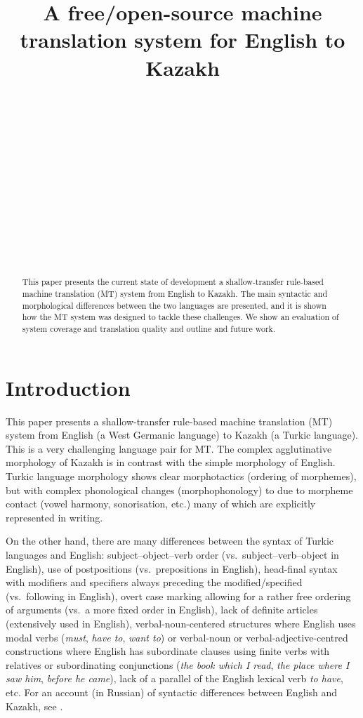 \documentclass[11pt]{article}
\title{A free/open-source machine translation system for English to Kazakh}
\author{\anonymize{Aida Sundetova}\\
  \anonymize{Kazakh National University, } \\
  \anonymize{050040 Almaty, Kazakhstan} \\
  \anonymize{{\tt sun27aida@gmail.com}}\\
  \And
  \anonymize{\textbf{Francis M. Tyers}}\\
  \anonymize{HSL-fakultehta}\\ 
  \anonymize{UiT Norgga \'{a}rktala\v{s} universitehta} \\
  \anonymize{N-9017 Romsa, Norway} \\
  \anonymize{{\tt francis.tyers@uit.no}}
  \And
  \anonymize{Mikel L.\ Forcada}\\
  \anonymize{Dept.\ Lleng.\ i Sist.\ Informàt.} \\
  \anonymize{Universitat d'Alacant,} \\ 
  \anonymize{E-03071 Alacant, Spain} \\
  \anonymize{{\tt mlf@dlsi.ua.es}}
}
\date{}
\begin{document}
\maketitle 
\renewcommand{\baselinestretch}{0.97} %
 

\begin{abstract}
This paper presents the current state of development a shallow-transfer rule-based machine 
translation (MT) system from English to Kazakh. The main syntactic and morphological differences 
between the two languages are presented, and it is shown how the MT 
system was designed to tackle these challenges. We show an evaluation of system coverage and 
translation quality and outline and future work.
\end{abstract}

\section{Introduction}

This paper presents a shallow-transfer rule-based machine translation (MT) system from English 
(a West Germanic language) to Kazakh (a Turkic language). This is a very challenging language pair for MT.
The complex agglutinative morphology of Kazakh 
is in contrast with the simple morphology of English.
Turkic language morphology shows clear morphotactics (ordering of morphemes), but with 
complex phonological changes (morphophonology) to due to morpheme contact (vowel harmony, 
sonorisation, etc.) many of which are explicitly represented in writing.

On the other hand, there are many differences between the syntax of Turkic languages 
and English: subject–object–verb order (vs.\ subject–verb–object in English), use of 
postpositions (vs.\ prepositions in English), head-final syntax with modifiers and specifiers 
always preceding the modified/specified (vs.\ following in English), overt case marking allowing 
for a rather free ordering of arguments (vs.\ a more fixed order in English), lack of definite 
articles (extensively used in English), verbal-noun-centered structures where English uses modal 
verbs (\emph{must}, \emph{have to}, \emph{want to}) or verbal-noun or verbal-adjective-centred constructions where 
English has subordinate clauses using finite verbs with relatives or subordinating 
conjunctions (\emph{the book which I read}, \emph{the place where I saw him}, \emph{before he came}), lack of a parallel 
of the English lexical verb \emph{to have}, etc. For an account (in Russian) of 
syntactic differences between English and Kazakh, see \cite{pecherskih2012}.
\end{document}
